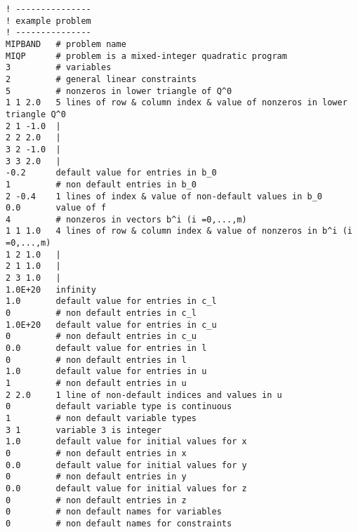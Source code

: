 {\small
\begin{verbatim}
! ---------------
! example problem
! ---------------
MIPBAND   # problem name
MIQP      # problem is a mixed-integer quadratic program
3         # variables
2         # general linear constraints
5         # nonzeros in lower triangle of Q^0
1 1 2.0   5 lines of row & column index & value of nonzeros in lower triangle Q^0
2 1 -1.0  |
2 2 2.0   |
3 2 -1.0  |
3 3 2.0   |
-0.2      default value for entries in b_0
1         # non default entries in b_0
2 -0.4    1 lines of index & value of non-default values in b_0
0.0       value of f
4         # nonzeros in vectors b^i (i =0,...,m)
1 1 1.0   4 lines of row & column index & value of nonzeros in b^i (i =0,...,m)
1 2 1.0   |
2 1 1.0   |
2 3 1.0   |
1.0E+20   infinity
1.0       default value for entries in c_l
0         # non default entries in c_l
1.0E+20   default value for entries in c_u
0         # non default entries in c_u
0.0       default value for entries in l
0         # non default entries in l
1.0       default value for entries in u
1         # non default entries in u
2 2.0     1 line of non-default indices and values in u
0         default variable type is continuous
1         # non default variable types
3 1       variable 3 is integer
1.0       default value for initial values for x
0         # non default entries in x
0.0       default value for initial values for y
0         # non default entries in y
0.0       default value for initial values for z
0         # non default entries in z
0         # non default names for variables
0         # non default names for constraints
\end{verbatim}
}



